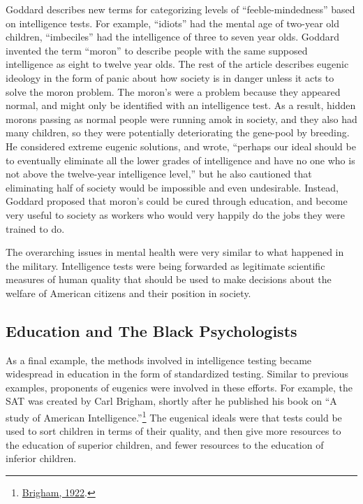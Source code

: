 \documentclass[
  oneside,
  12pt]{crumpbook}
\begin{document}
Goddard describes new terms for categorizing levels of ``feeble-mindedness'' based on intelligence tests. For example, ``idiots'' had the mental age of two-year old children, ``imbeciles'' had the intelligence of three to seven year olds. Goddard invented the term ``moron'' to describe people with the same supposed intelligence as eight to twelve year olds. The rest of the article describes eugenic ideology in the form of panic about how society is in danger unless it acts to solve the moron problem. The moron's were a problem because they appeared normal, and might only be identified with an intelligence test. As a result, hidden morons passing as normal people were running amok in society, and they also had many children, so they were potentially deteriorating the gene-pool by breeding. He considered extreme eugenic solutions, and wrote, ``perhaps our ideal should be to eventually eliminate all the lower grades of intelligence and have no one who is not above the twelve-year intelligence level,'' but he also cautioned that eliminating half of society would be impossible and even undesirable. Instead, Goddard proposed that moron's could be cured through education, and become very useful to society as workers who would very happily do the jobs they were trained to do.

The overarching issues in mental health were very similar to what happened in the military. Intelligence tests were being forwarded as legitimate scientific measures of human quality that should be used to make decisions about the welfare of American citizens and their position in society.

\hypertarget{education-and-the-black-psychologists}{%
\subsection{Education and The Black Psychologists}\label{education-and-the-black-psychologists}}

As a final example, the methods involved in intelligence testing became widespread in education in the form of standardized testing. Similar to previous examples, proponents of eugenics were involved in these efforts. For example, the SAT was created by Carl Brigham, shortly after he published his book on ``A study of American Intelligence.''\footnote{\protect\hyperlink{ref-brighamStudyAmericanIntelligence1922}{Brigham, 1922}.} The eugenical ideals were that tests could be used to sort children in terms of their quality, and then give more resources to the education of superior children, and fewer resources to the education of inferior children.
\end{document}
